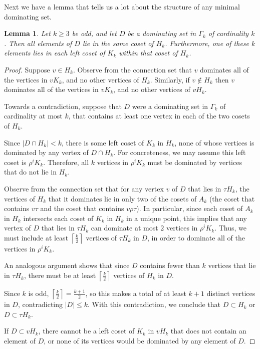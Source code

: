 \documentclass{amsart}
\newtheorem{lem}[thm]{Lemma}
\theoremstyle{remark}
\theoremstyle{definition}
\begin{document}
Next we have a lemma that tells us a lot about the structure of any minimal dominating set.

\begin{lem}\label{cover-diagonals}
   Let $k \ge 3$ be odd, and let $D$ be a dominating set in $\Gamma_k$ of cardinality $k$. Then all elements of $D$ lie in the same coset of $H_k$. Furthermore, one of these $k$ elements lies in each left coset of $K_k$ within that coset of $H_k$.
\end{lem}

\begin{proof}
Suppose $v \in H_k$.
Observe from the connection set that $v$ dominates all of the vertices in $vK_k$, and no other vertices of $H_k$. Similarly, if $v \notin H_k$ then $v$ dominates all of the vertices in $vK_k$, and no other vertices of $vH_k$.

Towards a contradiction, suppose that $D$ were a dominating set in $\Gamma_k$ of cardinality at most $k$, that contains at least one vertex in each of the two cosets of $H_k$.

Since $|D\cap H_k|<k$, there is some left coset of $K_k$ in $H_k$, none of whose vertices is dominated by any vertex of $D \cap H_k$. For concreteness, we may assume this left coset is $\rho^iK_k$. Therefore, all $k$ vertices in $\rho^iK_k$ must be dominated by vertices that do not lie in $H_k$.

Observe from the connection set that for any vertex $v$ of $D$ that lies in $\tau H_k$, the vertices of $H_k$ that it dominates lie in only two of the cosets of $A_k$ (the coset that contains $v\tau$ and the  coset that contains $v\rho\tau$). In particular, since each coset of $A_k$ in $H_k$ intersects each coset of $K_k$ in $H_k$ in a unique point, this implies that any vertex of $D$ that lies in $\tau H_k$ can dominate at most $2$ vertices in $\rho^iK_k$. Thus, we must include at least $\left\lceil\frac{k}{2}\right\rceil$ vertices of $\tau H_k$ in $D$, in order to dominate all of the vertices in $\rho^i K_k$.

An analogous argument shows that since $D$ contains fewer than $k$ vertices that lie in $\tau H_k$, there must be at least $\left\lceil\frac{k}{2}\right\rceil$ vertices of $H_k$ in $D$.

Since $k$ is odd, $\left\lceil\frac{k}{2}\right\rceil=\frac{k+1}{2}$, so this makes a total of at least $k+1$ distinct vertices in $D$, contradicting $|D| \le k$. With this contradiction, we conclude that $D \subset H_k$ or $D \subset \tau H_k$.

If $D \subset vH_k$, there cannot be a left coset of $K_k$ in $vH_k$ that does not contain an element of $D$, or none of its vertices would be dominated by any element of $D$.
\end{proof}
\end{document}
